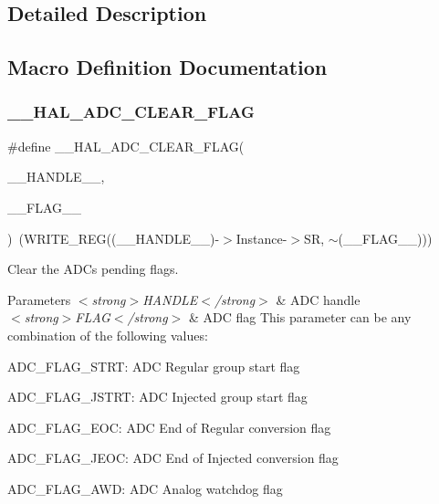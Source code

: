 \subsection{Detailed Description}


\subsection{Macro Definition Documentation}
\mbox{\label{group___a_d_c___exported___macros_gafe44e1e66141bca3665bb82981a81a17}} 
\subsubsection{\texorpdfstring{\+\_\+\+\_\+\+H\+A\+L\+\_\+\+A\+D\+C\+\_\+\+C\+L\+E\+A\+R\+\_\+\+F\+L\+AG}{\_\_HAL\_ADC\_CLEAR\_FLAG}}
{\footnotesize\ttfamily \#define \+\_\+\+\_\+\+H\+A\+L\+\_\+\+A\+D\+C\+\_\+\+C\+L\+E\+A\+R\+\_\+\+F\+L\+AG(\begin{DoxyParamCaption}\item[{}]{\+\_\+\+\_\+\+H\+A\+N\+D\+L\+E\+\_\+\+\_\+,  }\item[{}]{\+\_\+\+\_\+\+F\+L\+A\+G\+\_\+\+\_\+ }\end{DoxyParamCaption})~(W\+R\+I\+T\+E\+\_\+\+R\+EG((\+\_\+\+\_\+\+H\+A\+N\+D\+L\+E\+\_\+\+\_\+)-\/$>$Instance-\/$>$SR, $\sim$(\+\_\+\+\_\+\+F\+L\+A\+G\+\_\+\+\_\+)))}



Clear the A\+DC\textquotesingle{}s pending flags. 


\begin{DoxyParams}{Parameters}
{\em $<$strong$>$\+H\+A\+N\+D\+L\+E$<$/strong$>$} & A\+DC handle \\
\hline
{\em $<$strong$>$\+F\+L\+A\+G$<$/strong$>$} & A\+DC flag This parameter can be any combination of the following values\+: \begin{DoxyItemize}
\item A\+D\+C\+\_\+\+F\+L\+A\+G\+\_\+\+S\+T\+RT\+: A\+DC Regular group start flag \item A\+D\+C\+\_\+\+F\+L\+A\+G\+\_\+\+J\+S\+T\+RT\+: A\+DC Injected group start flag \item A\+D\+C\+\_\+\+F\+L\+A\+G\+\_\+\+E\+OC\+: A\+DC End of Regular conversion flag \item A\+D\+C\+\_\+\+F\+L\+A\+G\+\_\+\+J\+E\+OC\+: A\+DC End of Injected conversion flag \item A\+D\+C\+\_\+\+F\+L\+A\+G\+\_\+\+A\+WD\+: A\+DC Analog watchdog flag \end{DoxyItemize}
\\
\hline
\end{DoxyParams}

